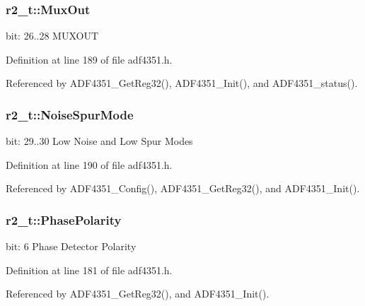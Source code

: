 \subsubsection[{\texorpdfstring{Mux\+Out}{MuxOut}}]{ r2\+\_\+t\+::\+Mux\+Out}\hypertarget{structr2__t_a284292bd7e449b3c4641639ed6826310}{}\label{structr2__t_a284292bd7e449b3c4641639ed6826310}
bit\+: 26..28 M\+U\+X\+O\+UT 

Definition at line 189 of file adf4351.\+h.



Referenced by A\+D\+F4351\+\_\+\+Get\+Reg32(), A\+D\+F4351\+\_\+\+Init(), and A\+D\+F4351\+\_\+status().

\subsubsection[{\texorpdfstring{Noise\+Spur\+Mode}{NoiseSpurMode}}]{ r2\+\_\+t\+::\+Noise\+Spur\+Mode}\hypertarget{structr2__t_a40bc8b8cb7d9e77e57abd0e8be4f01af}{}\label{structr2__t_a40bc8b8cb7d9e77e57abd0e8be4f01af}
bit\+: 29..30 Low Noise and Low Spur Modes 

Definition at line 190 of file adf4351.\+h.



Referenced by A\+D\+F4351\+\_\+\+Config(), A\+D\+F4351\+\_\+\+Get\+Reg32(), and A\+D\+F4351\+\_\+\+Init().

\subsubsection[{\texorpdfstring{Phase\+Polarity}{PhasePolarity}}]{ r2\+\_\+t\+::\+Phase\+Polarity}\hypertarget{structr2__t_a05ebd4a6ece2e0641678b20f162e08ab}{}\label{structr2__t_a05ebd4a6ece2e0641678b20f162e08ab}
bit\+: 6 Phase Detector Polarity 

Definition at line 181 of file adf4351.\+h.



Referenced by A\+D\+F4351\+\_\+\+Get\+Reg32(), and A\+D\+F4351\+\_\+\+Init().

